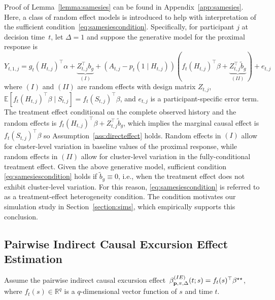 \documentclass[lineno]{biometrika}
\def\E{\mathbb{E}}
\begin{document}
Proof of Lemma~\ref{lemma:samesies} can be found in Appendix~\ref{app:samesies}. Here, a class of random effect models is introduced to help with interpretation of the sufficient condition~\eqref{eq:samesiescondition}.  Specifically, for participant $j$ at decision time~$t$, let $\Delta =1$ and suppose the generative model for the proximal response is
$$
Y_{t,1,j} = g_t(H_{t,j})^\top \alpha + \underbrace{Z_{t,j}^\top b_g}_{(I)} + (A_{t,j} - p_t(1 \mid H_{t,j})) (f_t( H_{t,j})^\top \beta + \underbrace{Z_{t,j}^\top \tilde b_g}_{(II)}) + e_{t,j}
$$
where $(I)$ and $(II)$ are random effects with \textbf{}design matrix $Z_{t,j}$, $\E[ f_t(H_{t,j})^\top \beta \mid S_{t,j} ] = f_t(S_{t,j})^\top \beta$, and $e_{t,j}$ is a participant-specific error term.  The treatment effect conditional on the complete observed history and the random effects is $f_t( H_{t,j})^\top \beta + Z_{t,j}^\top \tilde b_g$, which implies  the marginal causal effect is $f_t (S_{t,j})^\top \beta$ so Assumption~\ref{ass:directeffect} holds.  Random effects in $(I)$ allow for cluster-level variation in baseline values of the proximal response, while random effects in $(II)$ allow for cluster-level variation in the fully-conditional treatment effect. Given the above generative model, sufficient condition \eqref{eq:samesiescondition} holds if $\tilde b_g \equiv 0$, i.e., when the treatment effect does not exhibit cluster-level variation.
For this reason, \eqref{eq:samesiescondition} is referred to as a treatment-effect heterogeneity condition.
The condition motivates our simulation study in Section~\ref{section:sims}, which empirically supports this conclusion.


\subsection{Pairwise Indirect Causal Excursion Effect Estimation}
\label{section:indirect}

\begin{assumption} \normalfont
\label{ass:indirecteffect}
Assume the pairwise indirect causal excursion effect~$\beta^{(IE)}_{{\bf p}, \pi, \Delta}(t;s) = f_t (s)^\top \beta^{\star \star}$, where $f_t (s) \in \mathbb{R}^q$ is a $q$-dimensional vector function of $s$ and time $t$.
\end{assumption}
\end{document}
